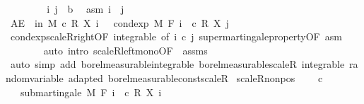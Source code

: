 \begin{isabellebody}
\isanewline
\ \ \isacommand{{\isacharbraceleft}{\kern0pt}}\isamarkupfalse%
\isanewline
\ \ \ \ \isamarkupfalse%
\ i\ j\ {\isacharcolon}{\kern0pt}{\isacharcolon}{\kern0pt}\ {\isacharprime}{\kern0pt}b\ \isamarkupfalse%
\ asm{\isacharcolon}{\kern0pt}\ {\isachardoublequoteopen}i\ {\isasymle}\ j{\isachardoublequoteclose}\isanewline
\ \ \ \ \isamarkupfalse%
\ {\isachardoublequoteopen}AE\ {\isasymxi}\ in\ M{\isachardot}{\kern0pt}\ c\ {\isacharasterisk}{\kern0pt}\isactrlsub R\ X\ i\ {\isasymxi}\ {\isasymge}\ cond{\isacharunderscore}{\kern0pt}exp\ M\ {\isacharparenleft}{\kern0pt}F\ i{\isacharparenright}{\kern0pt}\ {\isacharparenleft}{\kern0pt}{\isasymlambda}{\isasymxi}{\isachardot}{\kern0pt}\ c\ {\isacharasterisk}{\kern0pt}\isactrlsub R\ X\ j\ {\isasymxi}{\isacharparenright}{\kern0pt}\ {\isasymxi}{\isachardoublequoteclose}\ \isanewline
\ \ \ \ \ \ \isamarkupfalse%
\ cond{\isacharunderscore}{\kern0pt}exp{\isacharunderscore}{\kern0pt}scaleR{\isacharunderscore}{\kern0pt}right{\isacharbrackleft}{\kern0pt}OF\ integrable{\isacharcomma}{\kern0pt}\ of\ i\ {\isachardoublequoteopen}c{\isachardoublequoteclose}\ j{\isacharbrackright}{\kern0pt}\ supermartingale{\isacharunderscore}{\kern0pt}property{\isacharbrackleft}{\kern0pt}OF\ asm{\isacharbrackright}{\kern0pt}\ \isanewline
\ \ \ \ \ \ \isamarkupfalse%
\ {\isacharparenleft}{\kern0pt}auto\ intro{\isacharbang}{\kern0pt}{\isacharcolon}{\kern0pt}\ scaleR{\isacharunderscore}{\kern0pt}left{\isacharunderscore}{\kern0pt}mono{\isacharbrackleft}{\kern0pt}OF\ {\isacharunderscore}{\kern0pt}\ assms{\isacharbrackright}{\kern0pt}{\isacharparenright}{\kern0pt}\isanewline
\ \ \isacommand{{\isacharbraceright}{\kern0pt}}\isamarkupfalse%
\isanewline
{}\isamarkupfalse%
\ {\isacharparenleft}{\kern0pt}auto\ simp\ add{\isacharcolon}{\kern0pt}\ borel{\isacharunderscore}{\kern0pt}measurable{\isacharunderscore}{\kern0pt}integrable\ borel{\isacharunderscore}{\kern0pt}measurable{\isacharunderscore}{\kern0pt}scaleR\ integrable\ random{\isacharunderscore}{\kern0pt}variable\ adapted\ borel{\isacharunderscore}{\kern0pt}measurable{\isacharunderscore}{\kern0pt}const{\isacharunderscore}{\kern0pt}scaleR{\isacharparenright}{\kern0pt}%
\endisatagproof
{\isafoldproof}%
%
\isadelimproof
\isanewline
%
\endisadelimproof
\isanewline
{}\isamarkupfalse%
\ scaleR{\isacharunderscore}{\kern0pt}nonpos{\isacharcolon}{\kern0pt}\ \isanewline
\ \ \ {\isachardoublequoteopen}c\ {\isasymle}\ {}{\isachardoublequoteclose}\isanewline
\ \ \ {\isachardoublequoteopen}submartingale\ M\ F\ {\isacharparenleft}{\kern0pt}{\isasymlambda}i\ {\isasymxi}{\isachardot}{\kern0pt}\ c\ {\isacharasterisk}{\kern0pt}\isactrlsub R\ X\ i\ {\isasymxi}{\isacharparenright}{\kern0pt}{\isachardoublequoteclose}\isanewline

\end{isabellebody}
